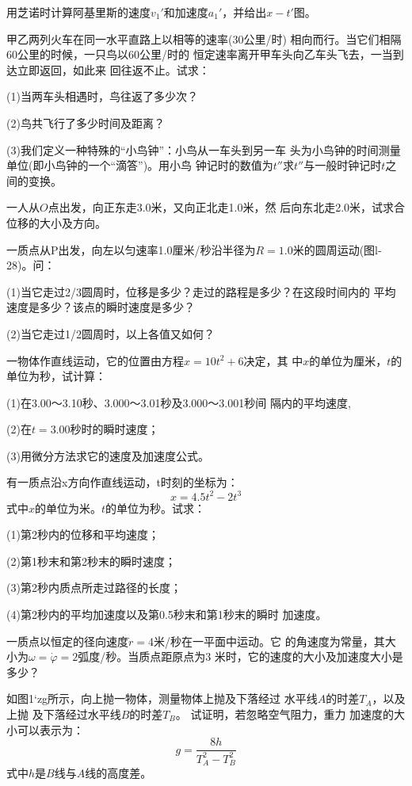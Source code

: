 \exercises

\exercise 用芝诺时计算阿基里斯的速度$v_1'$和加速度$a_1'$，并给出$x-t'$图。

\exercise 甲乙两列火车在同一水平直路上以相等的速率(30公里/时)
相向而行。当它们相隔60公里的时候，一只鸟以60公里/时的
恒定速率离开甲车头向乙车头飞去，一当到达立即返回，如此来
回往返不止。试求：

(1)当两车头相遇时，鸟往返了多少次？

(2)鸟共飞行了多少时间及距离？

(3)我们定义一种特殊的“小鸟钟”：小鸟从一车头到另一车
头为小鸟钟的时间测量单位(即小鸟钟的一个“滴答”)。用小鸟
钟记时的数值为$t''$求$t''$与一般时钟记时$t$之间的变换。

\exercise 一人从$O$点出发，向正东走3.0米，又向正北走1.0米，然
后向东北走2.0米，试求合位移的大小及方向。

\exercise 一质点从P出发，向左以匀速率1.0厘米/秒沿半径为$R=1.0$米的圆周运动(图l-28)。问：

(1)当它走过2/3圆周时，位移是多少？走过的路程是多少？在这段时间内的
平均速度是多少？该点的瞬时速度是多少？

(2)当它走过1/2圆周时，以上各值又如何？

\exercise 一物体作直线运动，它的位置由方程$x=10t^2+6$决定，其
中$x$的单位为厘米，$t$的单位为秒，试计算：

(1)在3.00～3.10秒、3.000～3.01秒及3.000～3.001秒间
隔内的平均速度,

(2)在$t=3.00$秒时的瞬时速度；

(3)用微分方法求它的速度及加速度公式。

\exercise 有一质点沿x方向作直线运动，t时刻的坐标为：
\begin{equation*}
    x=4.5t^2-2t^3
\end{equation*}
式中$x$的单位为米。$t$的单位为秒。试求：

(1)第2秒内的位移和平均速度；

(2)第1秒末和第2秒末的瞬时速度；

(3)第2秒内质点所走过路径的长度；

(4)第2秒内的平均加速度以及第0.5秒末和第1秒末的瞬时
加速度。

\exercise 一质点以恒定的径向速度$\dot r=4$米/秒在一平面中运动。它
的角速度为常量，其大小为$\omega=\dot \varphi=2$弧度/秒。当质点距原点为3
米时，它的速度的大小及加速度大小是多少？

\exercise 如图1‘zg所示，向上抛一物体，测量物体上抛及下落经过
水平线$A$的时差$T_A$，以及上抛
及下落经过水平线$B$的时差$T_B$。
试证明，若忽略空气阻力，重力
加速度的大小可以表示为：
\begin{equation*}
    g=\frac{8h}{T_A^2 - T_B^2}
\end{equation*}
式中$h$是$B$线与$A$线的高度差。

